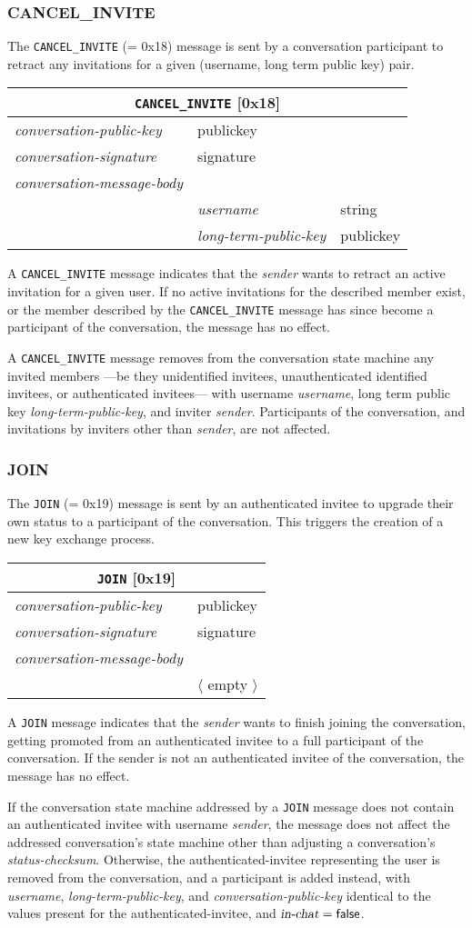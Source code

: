 \documentclass{article}
\def\npmessage#1{\texttt{#1}}
\def\field#1{\textit{#1}}
\def\smfield#1{\textsl{#1}}
\def\type#1{\textsf{#1}}
\newenvironment{conversationmessage}[2]{
\newcommand{\messagefield}[2]{
& \field{##1} & \type{##2} \\
\hline
}
\hspace{2em minus 2em}\begin{tabular}{|l|l|l|}
\hline
\multicolumn{3}{|c|}{\npmessage{#1} [#2]} \\
\hline
\hline
\field{conversation-public-key} & \multicolumn{2}{l|}{\type{publickey}} \\
\hline
\field{conversation-signature} & \multicolumn{2}{l|}{\type{signature}} \\
\hline
\field{conversation-message-body} & \multicolumn{2}{l|}{} \\
\hline
}{
\end{tabular}
}
\newcommand\emptyconversationmessage[2]{
\begin{conversationmessage}{#1}{#2}
& \multicolumn{2}{|l|}{ $\langle$ empty $\rangle$ } \\
\hline
\end{conversationmessage}
}
\begin{document}
\subsubsection{CANCEL\_INVITE}
\label{sec:messages/cancel-invite}

The \npmessage{CANCEL\_INVITE} (= 0x18) message is sent by a conversation participant to retract any invitations for a given (username, long term public key) pair.

\begin{conversationmessage}{CANCEL\_INVITE}{0x18}
\messagefield{username}{string}
\messagefield{long-term-public-key}{publickey}
\end{conversationmessage}

A \npmessage{CANCEL\_INVITE} message indicates that the \field{sender} wants to retract an active invitation for a given user.
If no active invitations for the described member exist, or the member described by the \npmessage{CANCEL\_INVITE} message has since become a participant of the conversation, the message has no effect.

A \npmessage{CANCEL\_INVITE} message removes from the conversation state machine any invited members ---be they unidentified invitees, unauthenticated identified invitees, or authenticated invitees--- with username \field{username}, long term public key \field{long-term-public-key}, and inviter \field{sender}.
Participants of the conversation, and invitations by inviters other than \field{sender}, are not affected.


\subsubsection{JOIN}
\label{sec:messages/join}

The \npmessage{JOIN} (= 0x19) message is sent by an authenticated invitee to upgrade their own status to a participant of the conversation.
This triggers the creation of a new key exchange process.

\emptyconversationmessage{JOIN}{0x19}

A \npmessage{JOIN} message indicates that the \field{sender} wants to finish joining the conversation, getting promoted from an authenticated invitee to a full participant of the conversation.
If the sender is not an authenticated invitee of the conversation, the message has no effect.

If the conversation state machine addressed by a \npmessage{JOIN} message does not contain an authenticated invitee with username \field{sender}, the message does not affect the addressed conversation's state machine other than adjusting a conversation's \smfield{status-checksum}.
Otherwise, the \type{authenticated-invitee} representing the user is removed from the conversation, and a \type{participant} is added instead, with \smfield{username}, \smfield{long-term-public-key}, and \smfield{conversation-public-key} identical to the values present for the \type{authenticated-invitee}, and $\smfield{in-chat} = \textsf{false}$.
\end{document}
